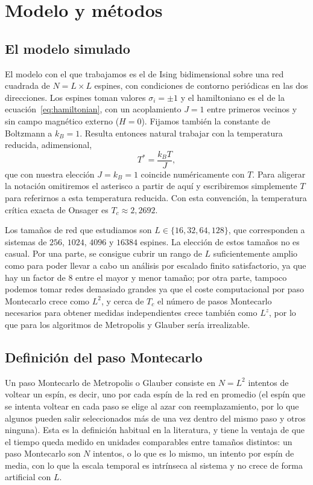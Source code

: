 \chapter{Modelo y métodos} \label{chap:metodos}

\section{El modelo simulado}

El modelo con el que trabajamos es el de Ising bidimensional sobre una red cuadrada de $N = L \times L$ espines, con condiciones de contorno periódicas en las dos direcciones. Los espines toman valores $\sigma_i = \pm 1$ y el hamiltoniano es el de la ecuación~\eqref{eq:hamiltonian}, con un acoplamiento $J = 1$ entre primeros vecinos y sin campo magnético externo ($H = 0$). Fijamos también la constante de Boltzmann a $k_B = 1$. Resulta entonces natural trabajar con la temperatura reducida, adimensional,
\[
T^* = \frac{k_B T}{J},
\]
que con nuestra elección $J = k_B = 1$ coincide numéricamente con $T$. Para aligerar la
notación omitiremos el asterisco a partir de aquí y escribiremos simplemente $T$ para
referirnos a esta temperatura reducida. Con esta convención, la temperatura crítica exacta
de Onsager \cite{Onsager1944} es $T_c \approx 2{,}2692$.

Los tamaños de red que estudiamos son $L \in \{16, 32, 64, 128\}$, que corresponden a sistemas de $256$, $1024$, $4096$ y $16384$ espines. La elección de estos tamaños no es casual. Por una parte, se consigue cubrir un rango de $L$ suficientemente amplio como para poder llevar a cabo un análisis por escalado finito satisfactorio, ya que hay un factor de 8 entre el mayor y menor tamaño; por otra parte, tampoco podemos tomar redes demasiado grandes ya que el coste computacional por paso Montecarlo crece como $L^2$, y cerca de $T_c$ el número de pasos Montecarlo necesarios para obtener medidas independientes crece también como $L^z$, por lo que para los algoritmos de Metropolis y Glauber sería irrealizable.

\section{Definición del paso Montecarlo} \label{sec:pasomc}

Un paso Montecarlo de Metropolis o Glauber consiste en $N = L^2$ intentos de voltear un espín, es decir, uno por cada espín de la red en promedio (el espín que se intenta voltear en cada paso se elige al azar con reemplazamiento, por lo que algunos pueden salir seleccionados más de una vez dentro del mismo paso y otros ninguna). Esta es la definición habitual en la literatura, y tiene la ventaja de que el tiempo queda medido en unidades comparables entre tamaños distintos: un paso Montecarlo son $N$ intentos, o lo que es lo mismo, un intento por espín de media, con lo que la escala temporal es intrínseca al sistema y no crece de forma artificial con $L$.

